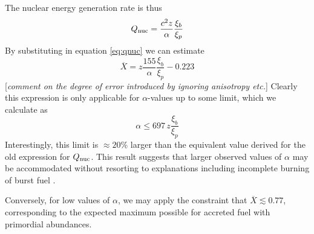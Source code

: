 \documentclass{aastex63}
\newcommand{\Xb}{\ensuremath{\overline{X}}}
\begin{document}
The nuclear energy generation rate is thus
\begin{equation}
Q_{\rm nuc} = \frac{c^2 z}{\alpha}\frac{\xi_b}{\xi_p} \label{qnuc}
\end{equation}
%
%
By substituting in equation \ref{eq:qnuc} we can estimate 
\begin{equation}
\Xb
 = z\frac{155}{\alpha}\frac{\xi_b}{\xi_p} - 0.223 \label{xbar}
\end{equation}
[{\it comment on the degree of error introduced by ignoring anisotropy etc.}] 
%
Clearly this expression is only applicable for $\alpha$-values up to some limit, which we calculate as
\begin{equation}
\alpha \leq 697\, z \frac{\xi_b}{\xi_p}
\end{equation}
Interestingly, this limit is 
$\approx20$\%
%
larger than the equivalent value derived for the old expression for $Q_{\rm nuc}$. This result suggests that larger observed values of $\alpha$ may be accommodated without resorting to explanations including incomplete burning of burst fuel \cite[e.g.][]{bcatalog}.

Conversely, for low values of $\alpha$, we may apply the constraint that $\Xb \lesssim 0.77$, corresponding to the expected maximum possible for accreted fuel with primordial abundances.
\end{document}
